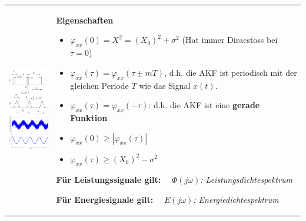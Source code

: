		\begin{tabularx}{\textwidth}{lX}
		\parbox{6cm}{
			\includegraphics[width=4cm]{./bilder/akf1.png}\\
			\includegraphics[width=4cm]{./bilder/akf2.png}
		} 
		&
		\parbox{12cm}{
			\textbf{Eigenschaften}
			\begin{itemize}
     			\item $\varphi_{xx}(0) = X^2 = (X_0)^2+\sigma^2$ (Hat immer Diracstoss bei $\tau = 0$)
     			\item $\varphi_{xx}(\tau)=\varphi_{xx}(\tau\pm mT)$, d.h. die AKF
     				ist periodisch mit der gleichen Periode $T$ wie das Signal $x(t)$.
				\item $\varphi_{xx}(\tau)=\varphi_{xx}(-\tau)$: d.h. die AKF ist eine {\bf gerade Funktion}
				\item $\varphi_{xx}(0)\geq|\varphi_{xx}(\tau)|\quad$
				\item $\varphi_{xx}(\tau)\geq (X_0)^2-\sigma^2\quad$
   			\end{itemize}
   			
   			\textbf{Für Leistungssignale gilt:} \ \ \textit{$\Phi(j\omega)$: Leistungsdichtespektrum} \\
   			\\
						
			\textbf{Für Energiesignale gilt:} \ \ \textit{$E(j\omega)$: Energiedichtespektrum} \\
   			\\
   
}
\end{tabularx}
